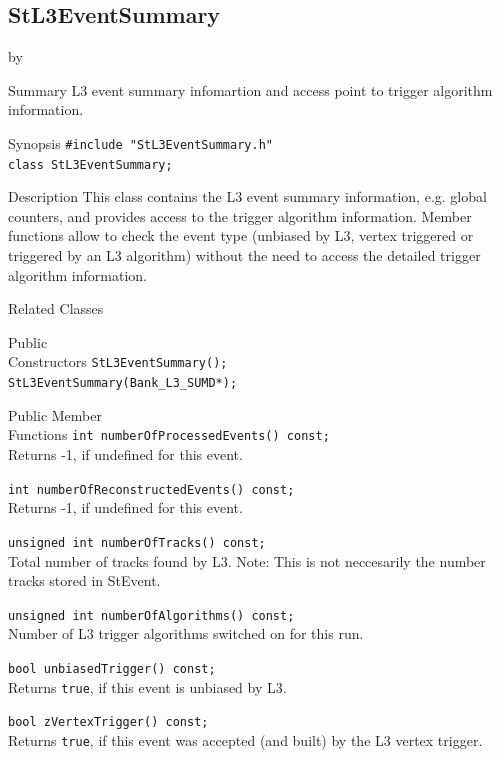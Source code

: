 \documentclass[twoside]{article}
\newcommand{\entrylabel}[1]{\mbox{\textbf{{#1}}}\hfil}%
\newenvironment{entry}
{\begin{list}{}%
    {\renewcommand{\makelabel}{\entrylabel}%
     \setlength{\labelwidth}{90pt}%
     \setlength{\leftmargin}{\labelwidth}
     \advance\leftmargin by \labelsep%
      }%
    }%
  {\end{list}}
\newcommand{\Entrylabel}[1]%
{\raisebox{0pt}[1ex][0pt]{\makebox[\labelwidth][l]%
    {\parbox[t]{\labelwidth}{\hspace{0pt}\textbf{{#1}}}}}}
\newenvironment{Entry}%
{\renewcommand{\entrylabel}{\Entrylabel}\begin{entry}}%
  {\end{entry}}
\begin{document}
\subsection{StL3EventSummary}
\label{sec:StL3EventSummary}
\begin{Entry}
\item[Summary] L3 event summary infomartion and access point to
trigger algorithm information.
\item[Synopsis]
    \verb+#include "StL3EventSummary.h"+\\
    \verb+class StL3EventSummary;+\\
\item[Description] This class contains the L3 event summary
        information, e.g. global counters, and provides access to the trigger
        algorithm information. Member functions allow to check the
        event type (unbiased by L3, vertex triggered or triggered by
        an L3 algorithm) without
        the need to access the detailed trigger algorithm information.
\item[Related Classes]
\item[Public\\ Constructors]
    \verb+StL3EventSummary();+\\
    \verb+StL3EventSummary(Bank_L3_SUMD*);+\\
\item[Public Member\\ Functions]
    \verb+int numberOfProcessedEvents() const;+\\
        Returns -1, if undefined for this event.

    \verb+int numberOfReconstructedEvents() const;+\\
        Returns -1, if undefined for this event.

    \verb+unsigned int numberOfTracks() const;+\\
        Total number of tracks found by L3. Note: This is not neccesarily the
        number tracks stored in StEvent.

    \verb+unsigned int numberOfAlgorithms() const;+\\
        Number of L3 trigger algorithms switched on for this run.

    \verb+bool unbiasedTrigger() const;+\\
        Returns \texttt{true}, if this event is unbiased by L3.

    \verb+bool zVertexTrigger() const;+\\
        Returns \texttt{true}, if this event was accepted (and built)
        by the L3 vertex trigger.


\end{Entry}
\end{document}
